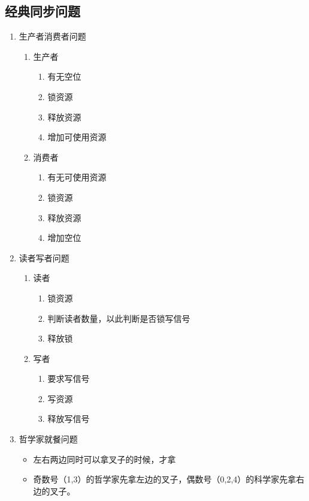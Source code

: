 \documentclass[11pt]{article}
\begin{document}
\subsection{经典同步问题}
\label{sec-2-10}
\begin{enumerate}
\item 生产者消费者问题
\label{sec-2-10-0-1}
\begin{enumerate}
\item 生产者
\label{sec-2-10-0-1-1}
\begin{enumerate}
\item 有无空位
\item 锁资源
\item 释放资源
\item 增加可使用资源
\end{enumerate}
\item 消费者
\label{sec-2-10-0-1-2}
\begin{enumerate}
\item 有无可使用资源
\item 锁资源
\item 释放资源
\item 增加空位
\end{enumerate}
\end{enumerate}
\item 读者写者问题
\label{sec-2-10-0-2}
\begin{enumerate}
\item 读者
\label{sec-2-10-0-2-1}
\begin{enumerate}
\item 锁资源
\item 判断读者数量，以此判断是否锁写信号
\item 释放锁
\end{enumerate}
\item 写者
\label{sec-2-10-0-2-2}
\begin{enumerate}
\item 要求写信号
\item 写资源
\item 释放写信号
\end{enumerate}
\end{enumerate}
\item 哲学家就餐问题
\label{sec-2-10-0-3}
\begin{itemize}
\item 左右两边同时可以拿叉子的时候，才拿
\item 奇数号（1,3）的哲学家先拿左边的叉子，偶数号（0,2,4）的科学家先拿右边的叉子。
\end{itemize}
\end{enumerate}
\end{document}
